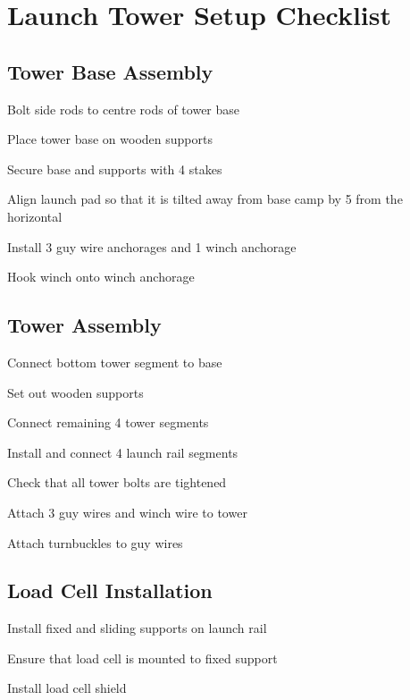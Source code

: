 \section{Launch Tower Setup Checklist}
\subsection{Tower Base Assembly}
\begin{checklist}
\item Bolt side rods to centre rods of tower base
\item Place tower base on wooden supports
\item Secure base and supports with 4 stakes
\item Align launch pad so that it is tilted away from base camp by 5\degree{} from the horizontal
\item Install 3 guy wire anchorages and 1 winch anchorage
\item Hook winch onto winch anchorage
\end{checklist}

\subsection{Tower Assembly}
\begin{checklist}
\item Connect bottom tower segment to base
\item Set out wooden supports
\item Connect remaining 4 tower segments
\item Install and connect 4 launch rail segments
\item Check that all tower bolts are tightened
\item Attach 3 guy wires and winch wire to tower
\item Attach turnbuckles to guy wires
\end{checklist}

\subsection{Load Cell Installation}
\begin{checklist}
\item Install fixed and sliding supports on launch rail
\item Ensure that load cell is mounted to fixed support
\item Install load cell shield
\end{checklist}

